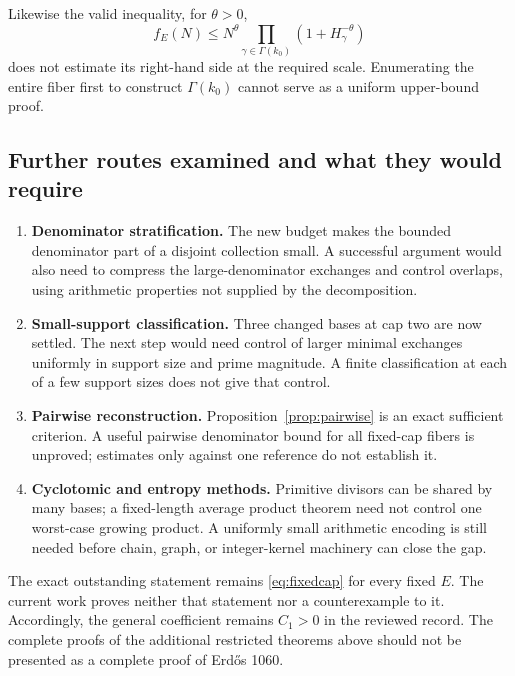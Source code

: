 \documentclass[11pt,a4paper]{article}
\theoremstyle{remark}
\begin{document}
Likewise the valid inequality, for $\theta>0$,
\[
 f_E(N)\le N^\theta
 \prod_{\gamma\in\Gamma(k_0)}(1+H_\gamma^{-\theta})
\]
does not estimate its right-hand side at the required scale. Enumerating the
entire fiber first to construct $\Gamma(k_0)$ cannot serve as a uniform
upper-bound proof.

\subsection{Further routes examined and what they would require}
\begin{enumerate}
\item \textbf{Denominator stratification.} The new budget makes the bounded
denominator part of a disjoint collection small. A successful argument would
also need to compress the large-denominator exchanges and control overlaps,
using arithmetic properties not supplied by the decomposition.
\item \textbf{Small-support classification.} Three changed bases at cap two
are now settled. The next step would need control of larger minimal exchanges
uniformly in support size and prime magnitude. A finite classification at
each of a few support sizes does not give that control.
\item \textbf{Pairwise reconstruction.} Proposition~\ref{prop:pairwise}
is an exact sufficient criterion. A useful pairwise denominator bound for all
fixed-cap fibers is unproved; estimates only against one reference do not
establish it.
\item \textbf{Cyclotomic and entropy methods.} Primitive divisors can be
shared by many bases; a fixed-length average product theorem need not control
one worst-case growing product. A uniformly small arithmetic encoding is
still needed before chain, graph, or integer-kernel machinery can close the gap.
\end{enumerate}

The exact outstanding statement remains \eqref{eq:fixedcap} for every fixed
$E$. The current work proves neither that statement nor a counterexample to it.
Accordingly, the general coefficient remains $C_1>0$ in the reviewed record.
The complete proofs of the additional restricted theorems above should not be
presented as a complete proof of Erd\H{o}s 1060.
\end{document}
